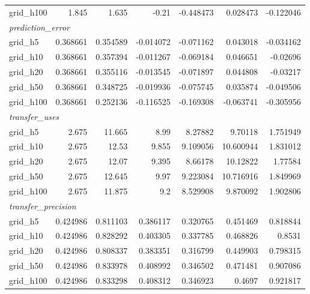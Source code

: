 \begin{tabular}{lrrrrrr}
  grid_h100 & 1.845 & 1.635 & -0.21 & -0.448473 & 0.028473 & -0.122046 \\
  \multicolumn{7}{l}{\textit{prediction_error}} \\
  grid_h5 & 0.368661 & 0.354589 & -0.014072 & -0.071162 & 0.043018 & -0.034162 \\
  grid_h10 & 0.368661 & 0.357394 & -0.011267 & -0.069184 & 0.046651 & -0.02696 \\
  grid_h20 & 0.368661 & 0.355116 & -0.013545 & -0.071897 & 0.044808 & -0.03217 \\
  grid_h50 & 0.368661 & 0.348725 & -0.019936 & -0.075745 & 0.035874 & -0.049506 \\
  grid_h100 & 0.368661 & 0.252136 & -0.116525 & -0.169308 & -0.063741 & -0.305956 \\
  \multicolumn{7}{l}{\textit{transfer_uses}} \\
  grid_h5 & 2.675 & 11.665 & 8.99 & 8.27882 & 9.70118 & 1.751949 \\
  grid_h10 & 2.675 & 12.53 & 9.855 & 9.109056 & 10.600944 & 1.831012 \\
  grid_h20 & 2.675 & 12.07 & 9.395 & 8.66178 & 10.12822 & 1.77584 \\
  grid_h50 & 2.675 & 12.645 & 9.97 & 9.223084 & 10.716916 & 1.849969 \\
  grid_h100 & 2.675 & 11.875 & 9.2 & 8.529908 & 9.870092 & 1.902806 \\
  \multicolumn{7}{l}{\textit{transfer_precision}} \\
  grid_h5 & 0.424986 & 0.811103 & 0.386117 & 0.320765 & 0.451469 & 0.818844 \\
  grid_h10 & 0.424986 & 0.828292 & 0.403305 & 0.337785 & 0.468826 & 0.8531 \\
  grid_h20 & 0.424986 & 0.808337 & 0.383351 & 0.316799 & 0.449903 & 0.798315 \\
  grid_h50 & 0.424986 & 0.833978 & 0.408992 & 0.346502 & 0.471481 & 0.907086 \\
  grid_h100 & 0.424986 & 0.833298 & 0.408312 & 0.346923 & 0.4697 & 0.921817 \\
\bottomrule
\end{tabular}
